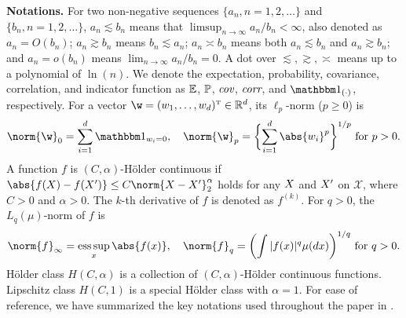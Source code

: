         \newcommand{\hld}{H}
        \textbf{Notations.} For two non-negative sequences $\{a_n, n=1,2,\ldots\}$ and $\{b_n, n=1,2,\ldots\}$, $a_n \lesssim b_n$ means that $\limsup_{n\to \infty} a_n/b_n < \infty$, also denoted as $a_n = O(b_n)$; $a_n \gtrsim b_n$ means $b_n \lesssim a_n$; $a_n \asymp b_n$ means both $a_n \lesssim b_n$ and $a_n \gtrsim b_n$; and $a_n=o(b_n)$ means $\lim_{n\to \infty} a_n/b_n=0$. A dot over $\lesssim, \gtrsim, \asymp$ means up to a polynomial of $\ln(n)$. We denote the expectation, probability, covariance, correlation, and indicator function as $\E$, $\P$, $\cov$, $\corr$, and $\ind_{(\cdot)}$, respectively. For a vector $\w=(w_1, \ldots, w_d)^\T \in \Real^d$, its $\ell_p$-norm ($p \geq 0$) is 
        \begin{align*}
            \norm{\w}_0 = \sum_{i=1}^d \ind_{w_i=0}, \quad 
            \norm{\w}_p = \biggl\{\sum_{i=1}^d \abs{w_i}^p\biggr\}^{1/p} \textrm{ for } p>0.
        \end{align*}
        A function $f$ is $(C,\alpha)$-H\"{o}lder continuous if $\abs{f(\X) - f(\X')} \leq C \norm{\X - \X'}_2^\alpha$ holds for any $\X$ and $ \X'$ on $\mathcal{X}$, where $C>0$ and $\alpha>0$. The $k$-th derivative of $f$ is denoted as $f^{(k)}$.
        For $q > 0$, the $L_q(\mu)$-norm of $f$ is 
        \begin{align*}
             \norm{f}_\infty = \esssup_{\x} \abs{f(\x)}, \quad 
 \norm{f}_q = \biggl(\int |f(\x)|^q\mu(d\x)\biggr)^{1/q}\textrm{ for } q>0 .
        \end{align*}  
        H\"{o}lder class $\hld(C,\alpha)$ is a collection of $(C,\alpha)$-H\"{o}lder continuous functions. 
        Lipschitz class $\hld(C,1)$ is a special H\"{o}lder class with $\alpha=1$. 
        For ease of reference, we have summarized the key notations used throughout the paper in . 

